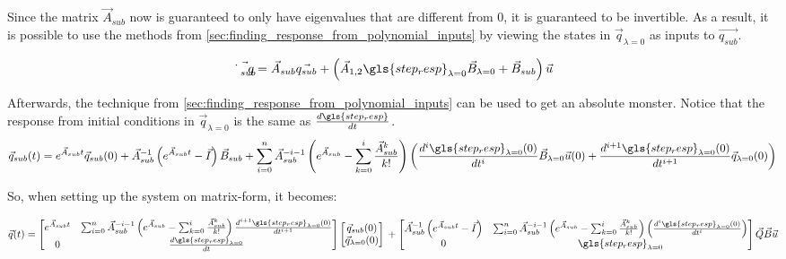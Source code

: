 Since the matrix $\Vec{A}_{sub}$ now is guaranteed to only have eigenvalues that are different from 0, it is guaranteed to be invertible\cite{LinSys_boken,Triangle_inequality_source}. As a result, it is possible to use the methods from \cref{sec:finding_response_from_polynomial_inputs} by viewing the states in $\Vec{q}_{\lambda =0}$ as inputs  to $\Vec{q_{sub}}$.

\begin{equation}
    \Vec{\dot{q}_{sub}} = \Vec{A}_{sub} \Vec{q_{sub}} + \left(\Vec{A}_{1,2}\gls{step_resp}_{\lambda=0}\Vec{B}_{\lambda=0} + \Vec{B}_{sub} \right)\Vec{u}
\end{equation}

Afterwards, the technique from \cref{sec:finding_response_from_polynomial_inputs} can be used to get an absolute monster. Notice that the response from initial conditions in $\Vec{q}_{\lambda =0}$ is the same as $\frac{d \gls{step_resp}}{dt }$. 
\begin{dmath}
    \Vec{q}_{sub}(t) = e^{\Vec{A}_{sub} t}\Vec{q}_{sub}(0) + \Vec{A}_{sub}^{-1}\left(e^{\Vec{A}_{sub} t} -\Vec{I}\right)\Vec{B}_{sub} \\+ \sum_{i=0}^n \Vec{A}_{sub}^{-i-1}\left( e^{\Vec{A}_{sub} } - \sum_{k=0}^{i} \frac{\Vec{A}^k_{sub}}{k!}\right) \left( \frac{d^i \gls{step_resp}_{\lambda=0}(0)}{dt^i} \Vec{B}_{\lambda=0}\Vec{u}(0) + \frac{d^{i+1} \gls{step_resp}_{\lambda=0}(0)}{dt^{i+1}} \Vec{q}_{\lambda=0}(0) \right) 
\end{dmath}

So, when setting up the system on matrix-form, it becomes: 

\begin{dmath}
    \Vec{q}(t) = 
    \begin{bmatrix}
        e^{\Vec{A}_{sub} t} & \sum_{i=0}^n \Vec{A}_{sub}^{-i-1}\left( e^{\Vec{A}_{sub} } - \sum_{k=0}^{i} \frac{\Vec{A}^k_{sub}}{k!}\right)\frac{d^{i+1} \gls{step_resp}_{\lambda=0}(0)}{dt^{i+1}} \\
        0 & \frac{d \gls{step_resp}_{\lambda=0}}{dt}
    \end{bmatrix}
    \begin{bmatrix}
        \Vec{q}_{sub}(0)\\
        \Vec{q}_{\lambda=0}(0)
    \end{bmatrix}\\
    + 
    \begin{bmatrix}
        \Vec{A}_{sub}^{-1}\left(e^{\Vec{A}_{sub} t} -\Vec{I}\right) &
        \sum_{i=0}^n \Vec{A}_{sub}^{-i-1}\left( e^{\Vec{A}_{sub} } - \sum_{k=0}^{i} \frac{\Vec{A}^k_{sub}}{k!}\right) \left( \frac{d^i \gls{step_resp}_{\lambda=0}(0)}{dt^i}  \right)  \\
        0 & \gls{step_resp}_{\lambda=0} 
    \end{bmatrix}
    \Vec{Q}\Vec{B}\Vec{u}
\end{dmath}

